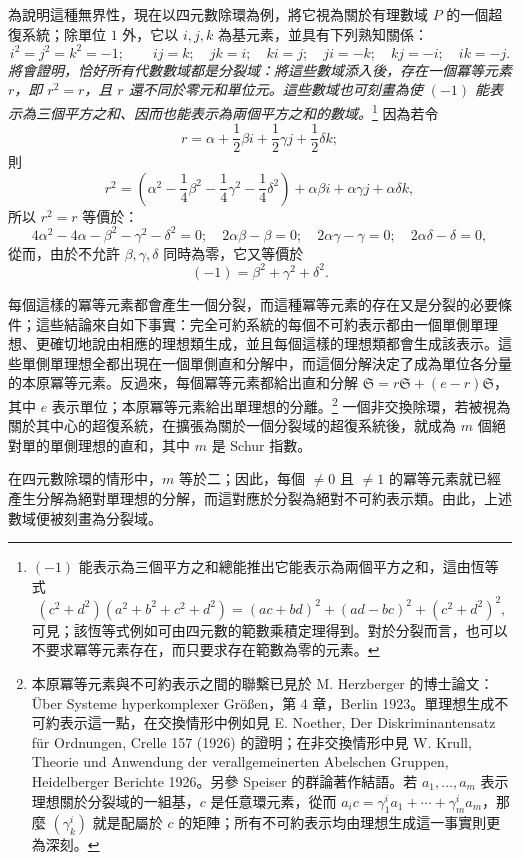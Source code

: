 \documentclass[11pt]{article}
\providecommand{\srcspaced}[1]{\emph{#1}}
\providecommand{\mS}{\mathfrak{S}}
\begin{document}
為說明這種無界性，現在以四元數除環為例，將它視為關於有理數域 $P$ 的一個超復系統；除單位 $1$ 外，它以 $i,j,k$ 為基元素，並具有下列熟知關係：
\[
 i^2=j^2=k^2=-1;\qquad ij=k;\quad jk=i;\quad ki=j;\quad ji=-k;\quad kj=-i;\quad ik=-j.
\]
\srcspaced{將會證明，恰好所有代數數域都是分裂域：將這些數域添入後，存在一個\guillemotright{}冪等\guillemotleft{}元素 $r$，即 $r^2=r$，且 $r$ 還不同於零元和單位元。這些數域也可刻畫為使 $(-1)$ 能表示為三個平方之和、因而也能表示為兩個平方之和的數域。}\footnote{$(-1)$ 能表示為三個平方之和總能推出它能表示為兩個平方之和，這由恆等式
\[
(c^2+d^2)(a^2+b^2+c^2+d^2)=(ac+bd)^2+(ad-bc)^2+(c^2+d^2)^2,
\]
可見；該恆等式例如可由四元數的範數乘積定理得到。對於分裂而言，也可以不要求冪等元素存在，而只要求存在範數為零的元素。} 因為若令
\[
        r=\alpha+\frac12\beta i+\frac12\gamma j+\frac12\delta k;
\]
則
\[
        r^2=\left(\alpha^2-\frac14\beta^2-\frac14\gamma^2-\frac14\delta^2\right)
          +\alpha\beta i+\alpha\gamma j+\alpha\delta k,
\]
所以 $r^2=r$ 等價於：
\[
4\alpha^2-4\alpha-\beta^2-\gamma^2-\delta^2=0;\quad
2\alpha\beta-\beta=0;\quad 2\alpha\gamma-\gamma=0;\quad 2\alpha\delta-\delta=0,
\]
從而，由於不允許 $\beta,\gamma,\delta$ 同時為零，它又等價於
\[
        (-1)=\beta^2+\gamma^2+\delta^2.
\]

每個這樣的冪等元素都會產生一個分裂，而這種冪等元素的存在又是分裂的必要條件；這些結論來自如下事實：完全可約系統的每個不可約表示都由一個單側單理想、更確切地說由相應的理想類生成，並且每個這樣的理想類都會生成該表示。這些單側單理想全都出現在一個單側直和分解中，而這個分解決定了成為單位各分量的\guillemotright{}本原\guillemotleft{}冪等元素。反過來，每個冪等元素都給出直和分解 $\mS=r\mS+(e-r)\mS$，其中 $e$ 表示單位；\guillemotright{}本原\guillemotleft{}冪等元素給出單理想的分離。\footnote{本原冪等元素與不可約表示之間的聯繫已見於 M. Herzberger 的博士論文：Über Systeme hyperkomplexer Größen，第 4 章，Berlin 1923。單理想生成不可約表示這一點，在交換情形中例如見 E. Noether, Der Diskriminantensatz für Ordnungen, Crelle 157 (1926) 的證明；在非交換情形中見 W. Krull, Theorie und Anwendung der verallgemeinerten Abelschen Gruppen, Heidelberger Berichte 1926。另參 Speiser 的群論著作結語。若 $a_1,\ldots,a_m$ 表示理想關於分裂域的一組基，$c$ 是任意環元素，從而 $a_i c=\gamma^i_1 a_1+\cdots+\gamma^i_m a_m$，那麼 $(\gamma^i_k)$ 就是配屬於 $c$ 的矩陣；所有不可約表示均由理想生成這一事實則更為深刻。} 一個非交換除環，若被視為關於其中心的超復系統，在擴張為關於一個分裂域的超復系統後，就成為 $m$ 個絕對單的單側理想的直和，其中 $m$ 是 Schur 指數。

在四元數除環的情形中，$m$ 等於二；因此，每個 $\ne0$ 且 $\ne1$ 的冪等元素就已經產生分解為絕對單理想的分解，而這對應於分裂為絕對不可約表示類。由此，上述數域便被刻畫為分裂域。
\end{document}
